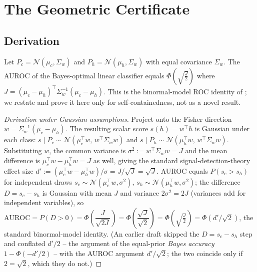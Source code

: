 \documentclass[onecolumn]{jmlr}
\begin{document}
\section{The Geometric Certificate}
\label{sec:certificate}

\subsection{Derivation}
\label{sec:cert-derivation}

\begin{proposition}
\label{prop:cert}
Let $P_c = \mathcal{N}(\mu_c, \Sigma_w)$ and
$P_h = \mathcal{N}(\mu_h, \Sigma_w)$ with equal covariance $\Sigma_w$.
The AUROC of the Bayes-optimal linear classifier equals
$\Phi\!\left(\sqrt{\frac{J}{2}}\right)$
where $J = (\mu_c - \mu_h)^\top \Sigma_w^{-1} (\mu_c - \mu_h)$. This is the
binormal-model ROC identity of \citet{green1966signal,bamber1975area,
hanley1982meaning}; we restate and prove it here only for
self-containedness, not as a novel result.
\end{proposition}

\begin{proof}[Derivation under Gaussian assumptions]
Project onto the Fisher direction $w = \Sigma_w^{-1}(\mu_c - \mu_h)$.
The resulting scalar score $s(h) = w^\top h$ is Gaussian under each class:
$s \mid P_c \sim \mathcal{N}(\mu^\top_c w,\, w^\top\Sigma_w w)$ and
$s \mid P_h \sim \mathcal{N}(\mu^\top_h w,\, w^\top\Sigma_w w)$.
Substituting $w$, the common variance is $\sigma^2 := w^\top\Sigma_w w = J$
and the mean difference is $\mu^\top_c w - \mu^\top_h w = J$ as well, giving
the standard signal-detection-theory effect size
$d' := (\mu^\top_c w - \mu^\top_h w)/\sigma = J/\sqrt{J} = \sqrt{J}$.
AUROC equals $P(s_c > s_h)$ for independent draws
$s_c \sim \mathcal{N}(\mu^\top_c w, \sigma^2)$,
$s_h \sim \mathcal{N}(\mu^\top_h w, \sigma^2)$; the difference
$D = s_c - s_h$ is Gaussian with mean $J$ and variance $2\sigma^2 = 2J$
(variances add for independent variables), so
$\text{AUROC} = P(D > 0) = \Phi\!\left(\dfrac{J}{\sqrt{2J}}\right)
= \Phi\!\left(\dfrac{\sqrt{J}}{\sqrt{2}}\right)
= \Phi\!\left(\sqrt{\frac{J}{2}}\right) = \Phi(d'/\sqrt{2})$,
the standard binormal-model identity. (An earlier draft skipped the
$D = s_c - s_h$ step and conflated $d'/2$ -- the argument of the
equal-prior \emph{Bayes accuracy} $1 - \Phi(-d'/2)$ -- with the AUROC
argument $d'/\sqrt{2}$; the two coincide only if $2 = \sqrt{2}$, which they
do not.)
\end{proof}
\end{document}

